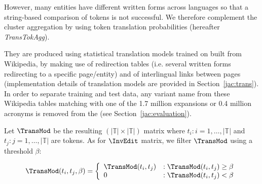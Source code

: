 \documentclass[output=paper]{langsci/langscibook}
\begin{document}
\begin{table}[h]
\caption{Example of clusters aggregated on the basis of translated tokens}
\label{jac:tab:translated token aggregation}
\end{table}


However, many entities have different written forms across languages
so that a string-based comparison of tokens is not successful. We
therefore complement the cluster aggregation by using token
translation probabilities (hereafter \linebreak\mbox{\textit{TransTokAgg}}).

They are produced using statistical translation models trained on
 built from Wikipedia, by making use of redirection
tables (i.e.  several written forms redirecting to a specific
page/entity) and of interlingual links between pages (implementation
details of translation models are provided in Section~\ref{jac:trans}).
In order to separate training and test data, any variant name from
these Wikipedia tables matching with one of the 1.7 million expansions
or 0.4 million acronyms is removed from the  (see
Section~\ref{jac:evaluation}).

Let $\TransMod$ be the resulting $(|\mathbb{T}| \times |\mathbb{T}|)$
 matrix where $t_i : i = 1,\ldots{},|\mathbb{T}|$ and $t_j
: j = 1,\ldots{},|\mathbb{T}|$ are tokens.  As for $\InvEdit$ matrix, we
filter $\TransMod$ using a threshold $\beta$:

\begin{equation}
\TransMod(t_i,t_j,\beta) =
\left\{
  \begin{array}{lr}
    \TransMod(t_i,t_j) & : \TransMod(t_i,t_j) \ge \beta\\
    0 & : \TransMod(t_i,t_j) < \beta
  \end{array}
\right.
\end{equation}
\end{document}
